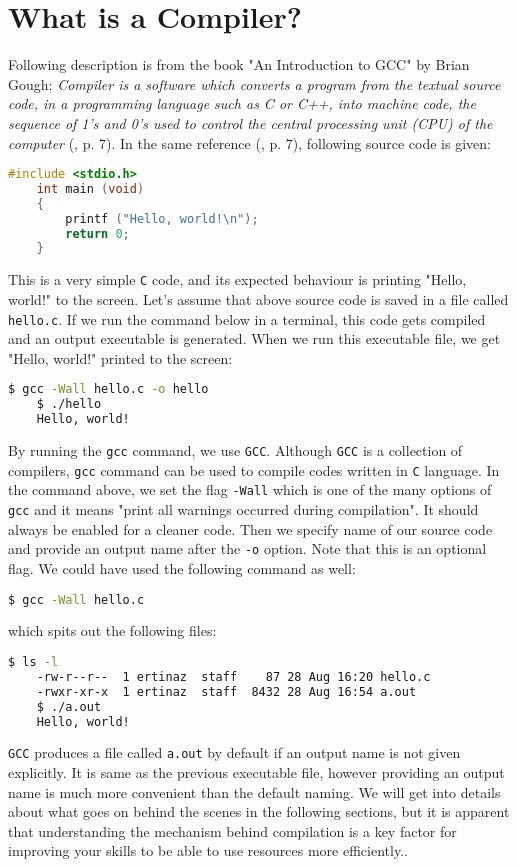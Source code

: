 \section{What is a Compiler?}
Following description is from the book "An Introduction to GCC" by Brian Gough;
\textit{Compiler is a software which converts a program from the textual source code, 
in a programming language such as C or C++, into machine code, the sequence 
of  1’s and 0’s used to control the central processing unit (CPU) of the computer}
(\cite{gough2004}, p. 7).
\newline \newline
In the same reference (\cite{gough2004}, p. 7), following source code is given:
\begin{lstlisting}[language=C]
    #include <stdio.h>
    int main (void)
    {
        printf ("Hello, world!\n");
        return 0; 
    }
\end{lstlisting}
This is a very simple \texttt{C} code, and its expected behaviour is printing 
"Hello, world!" to the screen. Let's assume that above source code is saved in a file 
called \texttt{hello.c}. If we run the command below in a terminal, this code gets
compiled and an output executable is generated. When we run this executable file, 
we get "Hello, world!" printed to the screen:
\begin{lstlisting}[language=bash]
    $ gcc -Wall hello.c -o hello
    $ ./hello
    Hello, world!
\end{lstlisting} 
By running the \texttt{gcc} command, we use \texttt{GCC}. Although \texttt{GCC} is a 
collection of compilers, \texttt{gcc} command can be used to compile codes written in 
\texttt{C} language. 
\newline
\newline
In the command above, we set the flag \texttt{-Wall} which is one of the many options of 
\texttt{gcc} and it means "print all warnings occurred during compilation". It should 
always be enabled for a cleaner code. Then we specify name of our source code and provide 
an output name after the \texttt{-o} option. Note that this is an optional flag. 
We could have used the following command as well:
\begin{lstlisting}[language=bash]
    $ gcc -Wall hello.c
\end{lstlisting} 
which spits out the following files:
\begin{lstlisting}[language=bash]
    $ ls -l
    -rw-r--r--  1 ertinaz  staff    87 28 Aug 16:20 hello.c
    -rwxr-xr-x  1 ertinaz  staff  8432 28 Aug 16:54 a.out
    $ ./a.out
    Hello, world!
\end{lstlisting} 
\texttt{GCC} produces a file called \texttt{a.out} by default if an output name is not given
explicitly. It is same as the previous executable file, however providing an output name 
is much more convenient than the default naming.
\newline \newline
We will get into details about what goes on behind the scenes in the following
sections, but it is apparent that understanding the mechanism behind compilation
is a key factor for improving your skills to be able to use resources more efficiently..

